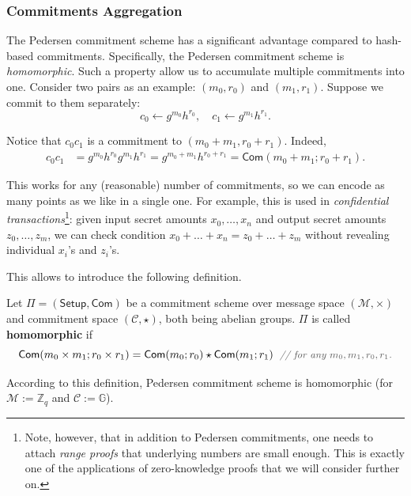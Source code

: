\documentclass[../../book]{subfiles}
\begin{document}
\subsubsection{Commitments Aggregation}

The Pedersen commitment scheme has a significant advantage compared to hash-based commitments.
Specifically, the Pedersen commitment scheme is \textit{homomorphic}.
Such a property allow us to accumulate multiple commitments into one.
Consider two pairs as an example: $(m_0, r_0)$ and $(m_1, r_1)$.
Suppose we commit to them separately:
\begin{equation*}
    c_0 \gets g^{m_0}h^{r_0}, \quad c_1 \gets g^{m_1}h^{r_1}.
\end{equation*}

Notice that $c_0c_1$ is a commitment to $(m_0+m_1,r_0+r_1)$. Indeed,
\begin{align*}
    c_0c_1 &= g^{m_0}h^{r_0}g^{m_1}h^{r_1} = g^{m_0+m_1}h^{r_0+r_1} = \mathsf{Com}(m_0+m_1;r_0+r_1).
\end{align*}

This works for any (reasonable) number of commitments, so we can encode as many points as we like in a single one.
For example, this is used in \emph{confidential transactions}\footnote{Note, however, that in addition to Pedersen commitments, one needs to attach \textit{range proofs} that underlying numbers are small enough. This is exactly one of the applications of zero-knowledge proofs that we will consider further on.}: given input secret amounts $x_0,\dots,x_n$ and output secret amounts $z_0,\dots,z_m$, we can check condition $x_0+\dots+x_n=z_0+\dots+z_m$ without revealing individual $x_i$'s and $z_i$'s.

This allows to introduce the following definition.

\begin{definition}
    Let $\Pi=(\mathsf{Setup},\mathsf{Com})$ be a commitment scheme over message space $(\mathcal{M},\times)$ and commitment space $(\mathcal{C},\star)$, both being abelian groups.
    $\Pi$ is called \textbf{homomorphic} if
    \begin{equation*}
        \mathsf{Com}(m_0 \times m_1; r_0 \times r_1) = \mathsf{Com}(m_0; r_0) \star \mathsf{Com}(m_1; r_1) \; \commentgray{for any $m_0,m_1, r_0,r_1$.}
    \end{equation*}
\end{definition}

According to this definition, Pedersen commitment scheme is homomorphic (for $\mathcal{M}:=\mathbb{Z}_q$ and $\mathcal{C}:=\mathbb{G}$).
\end{document}

